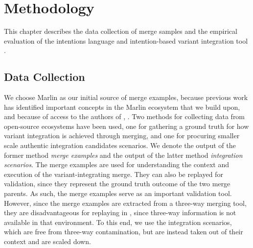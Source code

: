 \chapter{Methodology}
This chapter describes the data collection of merge samples and the empirical evaluation of the intentions language and intention-based variant integration tool \tooln.

\section{Data Collection}
We choose Marlin as our initial source of merge examples, because previous work has identified important concepts in the Marlin ecosystem that we build upon, and because of access to the authors of \cite{stanciulescu2015}, \cite{stanciulescu2016concepts}. Two methods for collecting data from open-source ecosystems have been used, one for gathering a ground truth for how variant integration is achieved through merging, and one for procuring smaller scale authentic integration candidates scenarios. We denote the output of the former method \textit{merge examples} and the output of the latter method \textit{integration scenarios}. The merge examples are used for understanding the context and execution of the variant-integrating merge. They can also be replayed for validation, since they represent the ground truth outcome of the two merge parents. As such, the merge examples serve as an important validation tool. However, since the merge examples are extracted from a three-way merging tool, they are disadvantageous for replaying in \tooln, since three-way information is not available in that environment. To this end, we use the integration scenarios, which are free from three-way contamination, but are instead taken out of their context and are scaled down.

